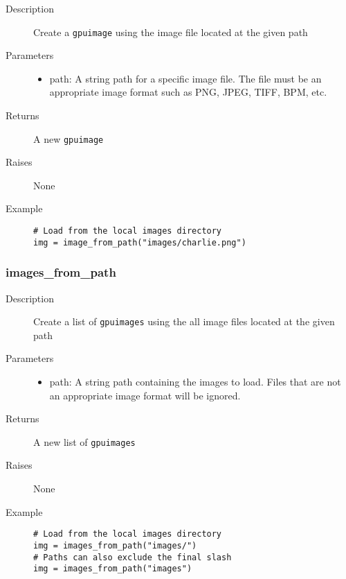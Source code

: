 \begin{description}
   \item[Description] Create a \verb|gpuimage| using the image file located at the given path
   \item[Parameters] \phantom{}
   \begin{itemize}
       \item path: A string path for a specific image file. The file must be an appropriate image format such as PNG, JPEG, TIFF, BPM, etc.
   \end{itemize}
   \item[Returns] A new \verb|gpuimage|
   \item[Raises] None
   \item[Example] \phantom{}
   \begin{lstlisting}
# Load from the local images directory
img = image_from_path("images/charlie.png")
\end{lstlisting}
\end{description}

\subsubsection{images\_from\_path}

\begin{description}
   \item[Description] Create a list of \verb|gpuimages| using the all image files located at the given path
   \item[Parameters] \phantom{}
   \begin{itemize}
       \item path: A string path containing the images to load. Files that are not an appropriate image format will be ignored.
   \end{itemize}
   \item[Returns] A new list of \verb|gpuimages|
   \item[Raises] None
   \item[Example] \phantom{}
   \begin{lstlisting}
# Load from the local images directory
img = images_from_path("images/")
# Paths can also exclude the final slash
img = images_from_path("images")
\end{lstlisting}
\end{description}


